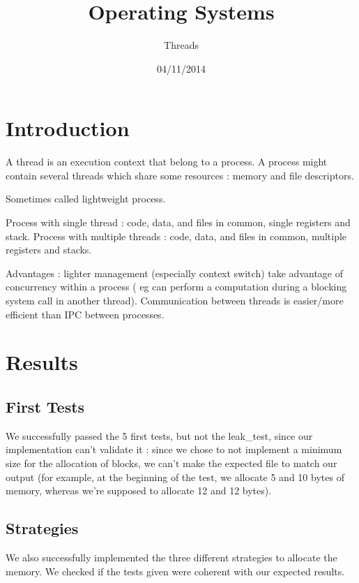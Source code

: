 \documentclass[a4paper,10pt]{article}
\title{Operating Systems}
\subtitle{Threads}
\author{}
\date{04/11/2014}
\begin{document}
\maketitle


\section{Introduction}

A thread is an execution context that belong to a process.
A process might contain several threads which share some resources : memory and file descriptors.

Sometimes called lightweight process.

Process with single thread : code, data, and files in common, single registers and stack.
Process with multiple threads : code, data, and files in common, multiple registers and stacks.

Advantages :
lighter management (especially context switch)
take advantage of concurrency within a process ( eg can perform a computation during a blocking system call in another thread).
Communication between threads is easier/more efficient than IPC between processes.


\section{Results}

\subsection{First Tests}

We successfully passed the 5 first tests, but not the leak\_test, since our implementation can't validate it : since we chose to not implement a minimum size for the allocation of blocks, we can't make the expected file to match our output (for example, at the beginning of the test, we allocate 5 and 10 bytes of memory, whereas we're supposed to allocate 12 and 12 bytes).

\subsection{Strategies}

We also successfully implemented the three different strategies to allocate the memory. We checked if the tests given were coherent with our expected results.
\end{document}
